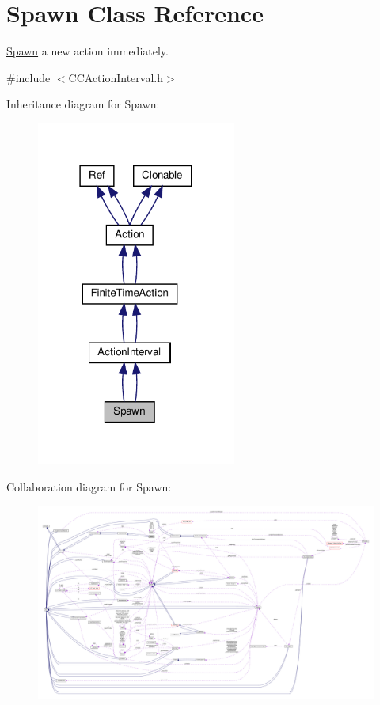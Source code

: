 \hypertarget{classSpawn}{}\section{Spawn Class Reference}
\label{classSpawn}


\hyperlink{classSpawn}{Spawn} a new action immediately.  




{\ttfamily \#include $<$C\+C\+Action\+Interval.\+h$>$}



Inheritance diagram for Spawn\+:
\nopagebreak
\begin{figure}[H]
\begin{center}
\leavevmode
\includegraphics[width=186pt]{classSpawn__inherit__graph}
\end{center}
\end{figure}


Collaboration diagram for Spawn\+:
\nopagebreak
\begin{figure}[H]
\begin{center}
\leavevmode
\includegraphics[width=350pt]{classSpawn__coll__graph}
\end{center}
\end{figure}
